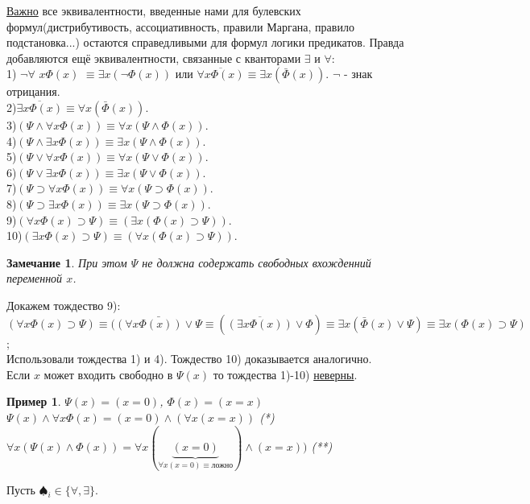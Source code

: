 \documentclass{article}
\newtheorem{example}{Пример}
\newtheorem{Remark}{Замечание}
\numberwithin{example}{section}
\numberwithin{question}{section}
\numberwithin{Remark}{section}
\numberwithin{theorem}{section}
\numberwithin{definition}{section}
\numberwithin{proposition}{section}
\begin{document}
	\underline{Важно} все эквивалентности, введенные нами для булевских формул(дистрибутивость, ассоциативность, правили Маргана, правило подстановка...) остаются справедливыми для формул логики предикатов. Правда добавляются ещё эквивалентности, связанные с кванторами $\exists$ и $\forall$:\\
	1) $\lnot \forall$ $x\Phi(x)$ $\equiv \exists x(\lnot\Phi(x))$ или $\overline{\forall x\Phi(x)}\equiv \exists x(\bar{\Phi}(x))$.  $\lnot$ - знак отрицания.\\
	2)$\overline{\exists x\Phi(x)}\equiv \forall x(\bar{\Phi}(x))$.\\
	3)$(\Psi\land \forall x\Phi(x))\equiv \forall x(\Psi \land \Phi(x))$.\\
	4)$(\Psi \land \exists x\Phi(x))\equiv \exists x(\Psi \land \Phi(x))$.\\
	5)$(\Psi \lor \forall x\Phi(x))\equiv \forall x(\Psi \lor \Phi(x))$.\\ 
	6)$(\Psi \lor \exists x\Phi(x))\equiv \exists x(\Psi \lor \Phi(x))$.\\
	7)$(\Psi \supset \forall x\Phi(x))\equiv \forall x(\Psi \supset \Phi(x))$.\\
	8)$(\Psi \supset \exists x\Phi(x))\equiv \exists x(\Psi \supset \Phi(x))$.\\
	9)$(\forall x\Phi(x)\supset \Psi)\equiv(\exists x(\Phi(x)\supset \Psi))$.\\
	10)$(\exists x\Phi(x)\supset \Psi)\equiv(\forall x(\Phi(x)\supset \Psi))$.
	\begin{Remark}
		При этом $\Psi$ не должна содержать свободных вхожденний переменной $x$.
	\end{Remark}
	Докажем тождество 9):\\
	$(\forall x\Phi(x)\supset \Psi)\equiv(\bar{(\forall x\Phi(x))\lor \Psi}\equiv(\overline{(\exists x \Phi(x))}\lor \Phi)\equiv \exists x(\bar{\Phi}(x)\lor \Psi)\equiv \exists x(\Phi(x)\supset \Psi)$;\\
	Использовали тождества 1) и 4). Тождество 10) доказывается аналогично.\\
	Если $x$ может входить свободно в $\Psi(x)$ то тождества 1)-10) \underline{неверны}.
	\begin{example}
		$\Psi(x)=(x=0)$, $\Phi(x)=(x=x)$ $\Psi(x)\land \forall x\Phi(x)=(x=0)\land (\forall x(x=x))$ (*)\\
		$\forall x(\Psi (x)\land \Phi(x))=\forall x(\underbrace{(x=0)}_{\forall x(x=0)\equiv \text{ложно}})\land (x=x))$ (**)
	\end{example}
	Пусть $\spadesuit_i\in \{\forall , \exists\}$.\\
\end{document}
